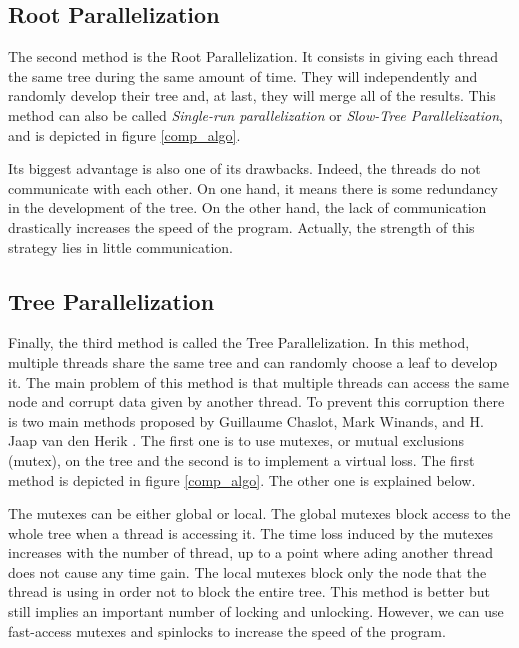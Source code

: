 \subsection{Root Parallelization}

The second method is the Root Parallelization. It consists in giving each thread the same tree during the same amount of time. They will independently and randomly develop their tree and, at last, they will merge all of the results. This method can also be called \emph{Single-run parallelization} or \emph{Slow-Tree Parallelization}, and is depicted in figure \ref{comp_algo}.
\newline

Its biggest advantage is also one of its drawbacks. Indeed, the threads do not communicate with each other. On one hand, it means there is some redundancy in the development of the tree. On the other hand, the lack of communication drastically increases the speed of the program. Actually, the strength of this strategy lies in little communication.

\subsection{Tree Parallelization}

Finally, the third method is called the Tree Parallelization. In this method, multiple threads share the same tree and can randomly choose a leaf to develop it. The main problem of this method is that multiple threads can access the same node and corrupt data given by another thread. To prevent this corruption there is two main methods proposed by Guillaume Chaslot, Mark Winands, and H. Jaap van den Herik \cite{parallel_comp}. The first one is to use mutexes, or mutual exclusions (mutex), on the tree and the second is to implement a virtual loss. The first method is depicted in figure \ref{comp_algo}. The other one is explained below.
\newline

The mutexes can be either global or local. The global mutexes block access to the whole tree when a thread is accessing it. The time loss induced by the mutexes increases with the number of thread, up to a point where ading another thread does not cause any time gain. The local mutexes block only the node that the thread is using in order not to block the entire tree. This method is better but still implies an important number of locking and unlocking. However, we can use fast-access mutexes and spinlocks to increase the speed of the program.
\newline

